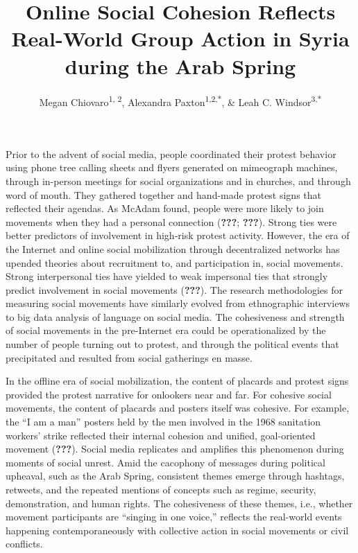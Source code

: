 \documentclass[english,man]{apa6}
\author{Megan Chiovaro\textsuperscript{1, 2}, Alexandra Paxton\textsuperscript{1,2,*}, \& Leah C. Windsor\textsuperscript{3,*}}
\affiliation{
\vspace{0.5cm}
\textsuperscript{1} Center for the Ecological Study of Perception and Action, University of Connecticut\\\textsuperscript{2} Department of Psychological Sciences, University of Connecticut\\\textsuperscript{3} University of Memphis\\\textsuperscript{*} Equal author contributions}
\title{Online Social Cohesion Reflects Real-World Group Action in Syria during the Arab Spring}
\date{}
\begin{document}
\maketitle

Prior to the advent of social media, people coordinated their protest behavior using phone tree calling sheets and flyers generated on mimeograph machines, through in-person meetings for social organizations and in churches, and through word of mouth. They gathered together and hand-made protest signs that reflected their agendas. As McAdam found, people were more likely to join movements when they had a personal connection ({\textbf{???}}; {\textbf{???}}). Strong ties were better predictors of involvement in high-risk protest activity. However, the era of the Internet and online social mobilization through decentralized networks has upended theories about recruitment to, and participation in, social movements. Strong interpersonal ties have yielded to weak impersonal ties that strongly predict involvement in social movements ({\textbf{???}}). The research methodologies for measuring social movements have similarly evolved from ethnographic interviews to big data analysis of language on social media. The cohesiveness and strength of social movements in the pre-Internet era could be operationalized by the number of people turning out to protest, and through the political events that precipitated and resulted from social gatherings en masse.

In the offline era of social mobilization, the content of placards and protest signs provided the protest narrative for onlookers near and far. For cohesive social movements, the content of placards and posters itself was cohesive. For example, the \enquote{I am a man} posters held by the men involved in the 1968 sanitation workers' strike reflected their internal cohesion and unified, goal-oriented movement ({\textbf{???}}). Social media replicates and amplifies this phenomenon during moments of social unrest. Amid the cacophony of messages during political upheaval, such as the Arab Spring, consistent themes emerge through hashtags, retweets, and the repeated mentions of concepts such as regime, security, demonstration, and human rights. The cohesiveness of these themes, i.e., whether movement participants are \enquote{singing in one voice,} reflects the real-world events happening contemporaneously with collective action in social movements or civil conflicts.
\end{document}
